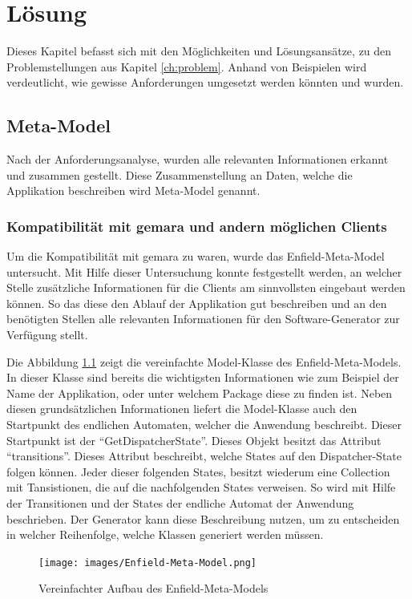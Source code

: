 \chapter{Lösung}
Dieses Kapitel befasst sich mit den Möglichkeiten und Lösungsansätze, zu den Problemstellungen aus Kapitel \ref{ch:problem}. Anhand von Beispielen wird verdeutlicht, wie gewisse Anforderungen umgesetzt werden könnten und wurden.

\section{Meta-Model}
Nach der Anforderungsanalyse, wurden alle relevanten Informationen erkannt und zusammen gestellt. Diese Zusammenstellung an Daten, welche die Applikation beschreiben wird Meta-Model genannt.

\subsection{Kompatibilität mit \acs{gemara} und andern möglichen Clients}

Um die Kompatibilität mit \acf{gemara} zu waren, wurde das Enfield-Meta-Model untersucht. Mit Hilfe dieser Untersuchung konnte festgestellt werden, an welcher Stelle zusätzliche Informationen für die Clients am sinnvollsten eingebaut werden können. So das diese den Ablauf der Applikation gut beschreiben und an den benötigten Stellen alle relevanten Informationen für den Software-Generator zur Verfügung stellt.

Die Abbildung \ref{fig:enfield-model} zeigt die vereinfachte Model-Klasse des Enfield-Meta-Models. 
In dieser Klasse sind bereits die wichtigsten Informationen wie zum Beispiel der Name der Applikation, oder unter welchem Package diese zu finden ist. Neben diesen grundsätzlichen Informationen liefert die Model-Klasse auch den Startpunkt des endlichen Automaten, welcher die Anwendung beschreibt. Dieser Startpunkt ist der \enquote{GetDispatcherState}. Dieses Objekt besitzt das Attribut \enquote{transitions}. Dieses Attribut beschreibt, welche States auf den Dispatcher-State folgen können. Jeder dieser folgenden States, besitzt wiederum eine Collection mit Tansistionen, die auf die nachfolgenden States verweisen. So wird mit Hilfe der Transitionen und der States der endliche Automat der Anwendung beschrieben. Der Generator kann diese Beschreibung nutzen, um zu entscheiden in welcher Reihenfolge, welche Klassen generiert werden müssen.

\begin{figure}[H]
	\begin{center}
		\texttt{[image: images/Enfield-Meta-Model.png]}
		\caption{Vereinfachter Aufbau des Enfield-Meta-Models}
		\label{fig:enfield-model}
	\end{center}
\end{figure}

